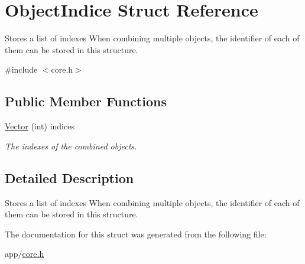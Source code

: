 \hypertarget{struct_object_indice}{}\section{Object\+Indice Struct Reference}
\label{struct_object_indice}


Stores a list of indexes When combining multiple objects, the identifier of each of them can be stored in this structure.  




{\ttfamily \#include $<$core.\+h$>$}

\subsection*{Public Member Functions}
\begin{DoxyCompactItemize}
\item 
\hyperlink{struct_object_indice_af231fd2f4bdcaa03c818779f0cd3aa2b}{Vector} (int) indices\hypertarget{struct_object_indice_af231fd2f4bdcaa03c818779f0cd3aa2b}{}\label{struct_object_indice_af231fd2f4bdcaa03c818779f0cd3aa2b}

\begin{DoxyCompactList}\small\item\em The indexes of the combined objects. \end{DoxyCompactList}\end{DoxyCompactItemize}


\subsection{Detailed Description}
Stores a list of indexes When combining multiple objects, the identifier of each of them can be stored in this structure. 

The documentation for this struct was generated from the following file\+:\begin{DoxyCompactItemize}
\item 
app/\hyperlink{core_8h}{core.\+h}\end{DoxyCompactItemize}
